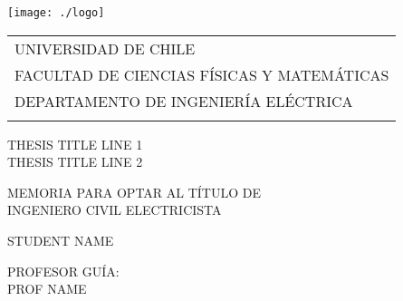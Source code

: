 \documentclass[letterpaper, 12pt]{scrreprt}
\begin{document}
\begin{titlepage}
\hspace{-0.6cm}
  \texttt{[image: ./logo]} 
	\hspace{-0.25cm}
  \begin{tabular}{l}
	\vspace{-0.5mm}
   \small{UNIVERSIDAD DE CHILE} \\
	\vspace{-0.5mm}
 	 \small{FACULTAD DE CIENCIAS FÍSICAS Y MATEM\'ATICAS} \\
 	 \small{DEPARTAMENTO DE INGENIER\'IA EL\'ECTRICA} \\
  \vspace*{1cm}\mbox{}
  \end{tabular}




\vspace*{6cm}
  
\begin{center}
\fontsize{4.8mm}{6mm}\selectfont 
THESIS TITLE LINE 1\\
THESIS TITLE LINE 2\\
	\vspace*{0.8 cm}
  
	\footnotesize{MEMORIA PARA OPTAR AL T\'ITULO DE} \\
  \footnotesize{INGENIERO CIVIL ELECTRICISTA} \\

  \vspace*{1.5 cm}
	
  \normalsize{STUDENT NAME} \\
	
	\vspace{2.7cm}
	
	\footnotesize{PROFESOR GUÍA:} \\
	\vspace{0.08 cm}
	\normalsize{PROF NAME} \\
	

\end{center}
\end{titlepage}
\end{document}
